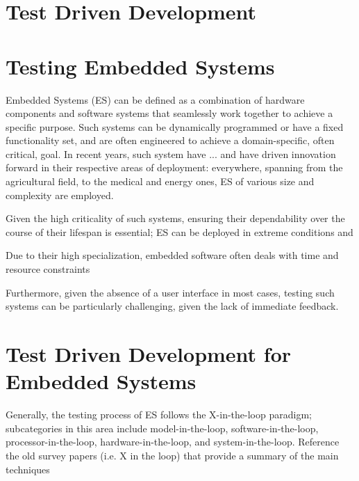 
\section{Test Driven Development}


\section{Testing Embedded Systems}
Embedded Systems (ES) can be defined as a combination of hardware components and software systems that seamlessly work together to achieve a specific purpose. Such systems can be dynamically programmed or have a fixed functionality set, and are often engineered to achieve a domain-specific, often critical, goal.
In recent years, such system have ... and have driven innovation forward in their respective areas of deployment: everywhere, spanning from the agricultural field, to the medical and energy ones, ES of various size and complexity are employed.


Given the high criticality of such systems, ensuring their dependability over the course of their lifespan is essential; ES can be deployed in extreme conditions and


Due to their high specialization, embedded software often deals with time and resource constraints

Furthermore, given the absence of a user interface in most cases, testing such systems can be particularly challenging, given the lack of immediate feedback.





\section{Test Driven Development for Embedded Systems}
Generally, the testing process of ES follows the X-in-the-loop paradigm; subcategories in this area include model-in-the-loop, software-in-the-loop, processor-in-the-loop, hardware-in-the-loop, and system-in-the-loop.
Reference the old survey papers (i.e. X in the loop) that provide a summary of the main techniques